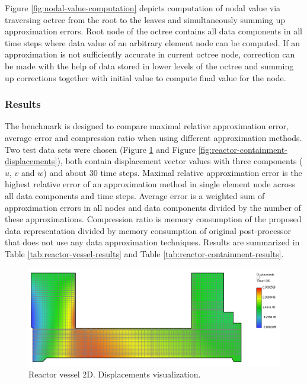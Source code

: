 Figure \ref{fig:nodal-value-computation} depicts computation of nodal value via traversing octree from the root to the leaves and simultaneously summing up approximation errors. Root node of the octree contains all data components in all time steps where data value of an arbitrary element node can be computed. If an approximation is not sufficiently accurate in current octree node, correction can be made with the help of data stored in lower levels of the octree and summing up corrections together with initial value to compute final value for the node.


\subsubsection{Results}

The benchmark is designed to compare maximal relative approximation error, average error and compression ratio when using different approximation methods. Two test data sets were chosen (Figure \ref{fig:reactor-vessel-displacements} and Figure \ref{fig:reactor-containment-displacements}), both contain displacement vector values with three components ($u$, $v$ and $w$) and about 30 time steps. Maximal relative approximation error is the highest relative error of an approximation method in single element node across all data components and time steps. Average error is a weighted sum of approximation errors in all nodes and data components divided by the number of these approximations. Compression ratio is memory consumption of the proposed data representation divided by memory consumption of original post-processor that does not use any data approximation techniques. Results are summarized in Table \ref{tab:reactor-vessel-results} and Table \ref{tab:reactor-containment-results}.

\begin{figure}[H]
\centering
\includegraphics[width=\textwidth]{figures/chapter-approximation/figure7}
\decoRule
\caption[Reactor vessel 2D.]{Reactor vessel 2D. Displacements visualization.}
\label{fig:reactor-vessel-displacements}
\end{figure}

